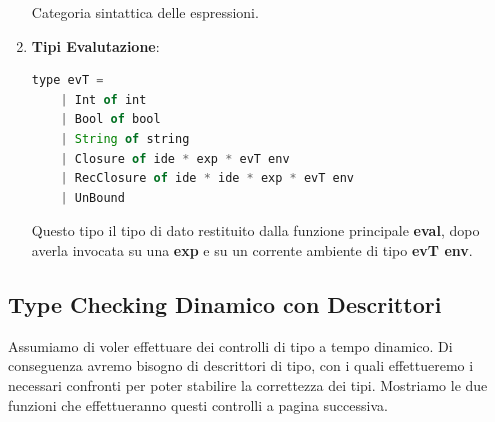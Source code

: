 \documentclass{article}
\begin{document}
\begin{enumerate}
Categoria sintattica delle espressioni.

    \item \textbf{Tipi Evalutazione}: 
    \vspace*{10px}
\begin{lstlisting}[language = JavaScript]
    type evT = 
    | Int of int 
    | Bool of bool 
    | String of string 
    | Closure of ide * exp * evT env 
    | RecClosure of ide * ide * exp * evT env
    | UnBound
\end{lstlisting}
\vspace*{-20px}

Questo tipo il tipo di dato restituito dalla funzione principale \textbf{eval}, dopo averla invocata su una \textbf{exp} e su un corrente ambiente di tipo \textbf{evT env}.

\end{enumerate}

\vspace*{5px}

\subsection{Type Checking Dinamico con Descrittori}

Assumiamo di voler effettuare dei controlli di tipo a tempo dinamico. Di conseguenza avremo bisogno di descrittori di tipo, con i quali effettueremo i necessari confronti per poter stabilire la correttezza dei tipi. Mostriamo le due funzioni che effettueranno questi controlli a pagina successiva.

\newpage
\end{document}
